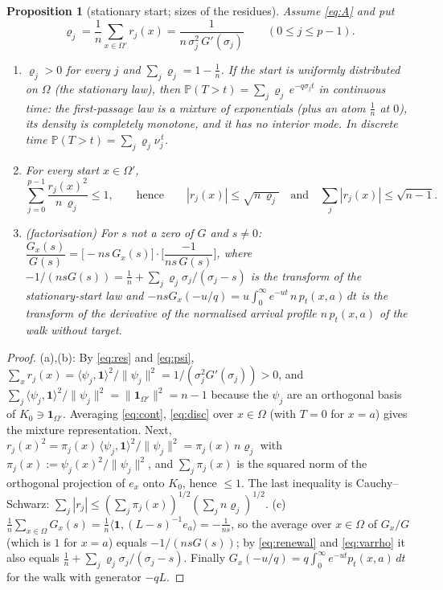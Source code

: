 \documentclass[11pt,a4paper]{article}
\newcommand{\one}{\mathbf 1}
\newcommand{\PP}{\mathbb P}
\newcommand{\ip}[2]{\langle #1,#2\rangle}
\theoremstyle{plain}
\newtheorem{proposition}[theorem]{Proposition}
\theoremstyle{definition}
\numberwithin{equation}{section}
\begin{document}
\begin{proposition}[stationary start; sizes of the residues]\label{prop:uniform}
Assume \eqref{eq:A} and put
\begin{equation}\label{eq:varrho}
\varrho_j=\frac1n\sum_{x\in\Omega'}r_j(x)=\frac{1}{n\,\sigma_j^2\,G'(\sigma_j)}\qquad(0\le j\le p-1).
\end{equation}
\begin{enumerate}
\item[(a)] $\varrho_j>0$ for every $j$ and $\sum_j\varrho_j=1-\frac1n$. If the start is uniformly distributed on $\Omega$ (the stationary law), then $\PP(T>t)=\sum_j\varrho_j\,e^{-q\sigma_jt}$ in continuous time: the first-passage law is a mixture of exponentials (plus an atom $\frac1n$ at $0$), its density is completely monotone, and it has no interior mode. In discrete time $\PP(T>t)=\sum_j\varrho_j\nu_j^{\,t}$.
\item[(b)] For every start $x\in\Omega'$,
\[
\sum_{j=0}^{p-1}\frac{r_j(x)^2}{n\,\varrho_j}\le1,\qquad\text{hence}\qquad|r_j(x)|\le\sqrt{n\,\varrho_j}\quad\text{and}\quad\sum_{j}|r_j(x)|\le\sqrt{n-1}.
\]
\item[(c)] (factorisation) For $s$ not a zero of $G$ and $s\ne0$: $\dfrac{G_x(s)}{G(s)}=\big[-ns\,G_x(s)\big]\cdot\Big[\dfrac{-1}{ns\,G(s)}\Big]$, where $-1/(nsG(s))=\frac1n+\sum_j\varrho_j\sigma_j/(\sigma_j-s)$ is the transform of the stationary-start law and $-nsG_x(-u/q)=u\int_0^\infty e^{-ut}\,n\,p_t(x,a)\,dt$ is the transform of the derivative of the normalised arrival profile $n\,p_t(x,a)$ of the walk without target.
\end{enumerate}
\end{proposition}
\begin{proof}
(a),(b): By \eqref{eq:res} and \eqref{eq:psi}, $\sum_{x}r_j(x)=\ip{\psi_j}{\one}^2/\|\psi_j\|^2=1/(\sigma_j^2G'(\sigma_j))>0$, and $\sum_j\ip{\psi_j}{\one}^2/\|\psi_j\|^2=\|\one_{\Omega'}\|^2=n-1$ because the $\psi_j$ are an orthogonal basis of $K_0\ni\one_{\Omega'}$. Averaging \eqref{eq:cont}, \eqref{eq:disc} over $x\in\Omega$ (with $T=0$ for $x=a$) gives the mixture representation. Next, $r_j(x)^2=\pi_j(x)\,\ip{\psi_j}\one^2/\|\psi_j\|^2=\pi_j(x)\,n\varrho_j$ with $\pi_j(x):=\psi_j(x)^2/\|\psi_j\|^2$, and $\sum_j\pi_j(x)$ is the squared norm of the orthogonal projection of $e_x$ onto $K_0$, hence $\le1$. The last inequality is Cauchy--Schwarz: $\sum_j|r_j|\le(\sum_j\pi_j(x))^{1/2}(\sum_jn\varrho_j)^{1/2}$.
(c) $\frac1n\sum_{x\in\Omega}G_x(s)=\frac1n\ip{\one}{(L-s)^{-1}e_a}=-\frac1{ns}$, so the average over $x\in\Omega$ of $G_x/G$ (which is $1$ for $x=a$) equals $-1/(nsG(s))$; by \eqref{eq:renewal} and \eqref{eq:varrho} it also equals $\frac1n+\sum_j\varrho_j\sigma_j/(\sigma_j-s)$. Finally $G_x(-u/q)=q\int_0^\infty e^{-ut}p_t(x,a)\,dt$ for the walk with generator $-qL$.
\end{proof}
\end{document}
